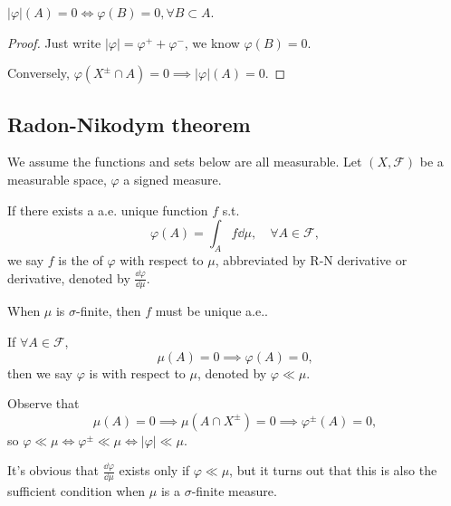 \begin{lemma}
	$|\varphi|(A) = 0\iff \varphi(B) = 0, \forall B \subset A$.
\end{lemma}
\begin{proof}[Proof]
    Just write $|\varphi| = \varphi^+ + \varphi^-$,
	we know $\varphi(B) = 0$.

	Conversely, $\varphi(X^\pm \cap A) = 0\implies |\varphi|(A) = 0$.
\end{proof}

\subsection{Radon-Nikodym theorem}
\label{sub:Radon-Nikodym theorem}
We assume the functions and sets below are all measurable.
Let $(X, \mathscr{F})$ be a measurable space, $\varphi$ a signed measure.

\begin{definition}[R-N derivative]
	If there exists a a.e. unique function $f$ s.t.
	\[
	\varphi(A) = \int_A f\dd \mu, \quad \forall A\in \mathscr{F},
	\]
	we say $f$ is the  of $\varphi$
	with respect to $\mu$, abbreviated by R-N derivative or derivative,
	denoted by $\frac{\dd\varphi}{\dd \mu}$.
\end{definition}
\begin{remark}
    When $\mu$ is $\sigma$-finite, then $f$ must be unique a.e..
\end{remark}

\begin{definition}
	If $\forall A\in \mathscr{F}$,
	\[
	\mu(A) = 0 \implies \varphi(A) = 0,
	\]
	then we say $\varphi$ is  with
	respect to $\mu$, denoted by $\varphi\ll \mu$.
\end{definition}
Observe that
\[
\mu(A) = 0\implies \mu(A\cap X^\pm) = 0\implies \varphi^\pm(A) = 0,
\]
so $\varphi\ll\mu \iff \varphi^\pm\ll \mu \iff |\varphi|\ll\mu$.

It's obvious that $\frac{\dd\varphi}{\dd\mu}$ exists only if $\varphi\ll\mu$,
but it turns out that this is also the sufficient condition
when $\mu$ is a $\sigma$-finite measure.

